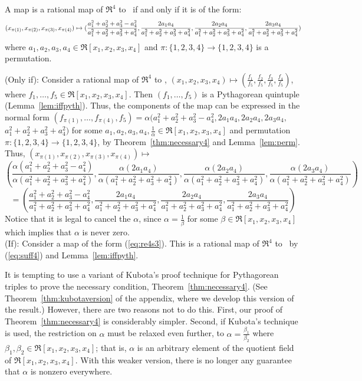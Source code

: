 \begin{theorem}
\label{thm:map4}
A map is a rational map of $\Re^4$ to \ if and only if
it is of the form:
\begin{equation}
\label{eq:re4s3}
\footnotesize{(x_{\pi(1)},x_{\pi(2)},x_{\pi(3)},x_{\pi(4)})} \mapsto 
\footnotesize{(\frac{a_1^2 + a_2^2 + a_3^2 - a_4^2}{a_1^2 + a_2^2 + a_3^2 + a_4^2},
	 \frac{2a_1a_4}{a_1^2 + a_2^2 + a_3^2 + a_4^2},
	 \frac{2a_2a_4}{a_1^2 + a_2^2 + a_3^2 + a_4^2},
	 \frac{2a_3a_4}{a_1^2 + a_2^2 + a_3^2 + a_4^2})}
\end{equation}
where $a_1,a_2,a_3,a_4 \in \Re[x_1,x_2,x_3,x_4]$
and $\pi : \{1,2,3,4\} \rightarrow \{1,2,3,4\}$ is a permutation.
\end{theorem}
\prf
(Only if): Consider a rational map
of $\Re^4$ to , $(x_1,x_2,x_3,x_4) \mapsto 
(\frac{f_1}{f_5},\frac{f_2}{f_5},\frac{f_3}{f_5},\frac{f_4}{f_5})$,
where $f_1,\ldots,f_5 \in \Re[x_1,x_2,x_3,x_4]$.
Then $(f_1,\ldots,f_5)$ is a Pythagorean quintuple (Lemma~\ref{lem:iffpyth}).
Thus, the components of the map can be expressed in the normal form
$(f_{\pi(1)},\ldots,f_{\pi(4)},f_5) = \alpha (a_1^2 + a_2^2 + a_3^2 - a_4^2,
2a_1a_4,2a_2a_4,2a_3a_4,$ $a_1^2 + a_2^2 + a_3^2 + a_4^2)$
for some $a_1,a_2,a_3,a_4,\frac{1}{\alpha} \in \Re[x_1,x_2,x_3,x_4]$
and permutation $\pi:\{1,2,3,4\} \rightarrow \{1,2,3,4\}$,
by Theorem~\ref{thm:necessary4} and Lemma~\ref{lem:perm}.
Thus, $(x_{\pi(1)},x_{\pi(2)},x_{\pi(3)},x_{\pi(4)}) \mapsto$
\[
	(\frac{\alpha(a_1^2 + a_2^2 + a_3^2 - a_4^2)}{\alpha(a_1^2 + a_2^2 + a_3^2 + a_4^2)},
	 \frac{\alpha(2a_1a_4)}{\alpha(a_1^2 + a_2^2 + a_3^2 + a_4^2)},
	 \frac{\alpha(2a_2a_4)}{\alpha(a_1^2 + a_2^2 + a_3^2 + a_4^2)},
	 \frac{\alpha(2a_3a_4)}{\alpha(a_1^2 + a_2^2 + a_3^2 + a_4^2)})
\]
\[
= 	(\frac{a_1^2 + a_2^2 + a_3^2 - a_4^2}{a_1^2 + a_2^2 + a_3^2 + a_4^2},
	 \frac{2a_1a_4}{a_1^2 + a_2^2 + a_3^2 + a_4^2},
	 \frac{2a_2a_4}{a_1^2 + a_2^2 + a_3^2 + a_4^2},
	 \frac{2a_3a_4}{a_1^2 + a_2^2 + a_3^2 + a_4^2})
\]
Notice that it is legal to cancel the $\alpha$, since
$\alpha = \frac{1}{\beta}$ for some $\beta \in \Re[x_1,x_2,x_3,x_4]$
which implies that $\alpha$ is never zero.\\
(If): Consider a map of the form (\ref{eq:re4s3}).
This is a rational map of $\Re^4$ to \ by (\ref{eq:suff4})
and Lemma~\ref{lem:iffpyth}.
\QED

\begin{rmk}
It is tempting to use a variant of Kubota's proof technique 
for Pythagorean triples to prove the necessary condition, Theorem~\ref{thm:necessary4}.
\ifFull
(See Theorem~\ref{thm:kubotaversion} of the appendix, where we develop this
version of the result.)
\fi
However, there are two reasons not to do this.
First, our proof of Theorem~\ref{thm:necessary4} is considerably simpler.
Second, if Kubota's technique is used, the restriction
on $\alpha$ must be relaxed even further, to $\alpha = \frac{\beta_1}{\beta_2}$
where $\beta_1,\beta_2 \in \Re[x_1,x_2,x_3,x_4]$;
that is, $\alpha$ is an arbitrary element of the quotient field of
$\Re[x_1,x_2,x_3,x_4]$.
With this weaker version, there is no longer any guarantee that $\alpha$ is 
nonzero everywhere.
\end{rmk}


